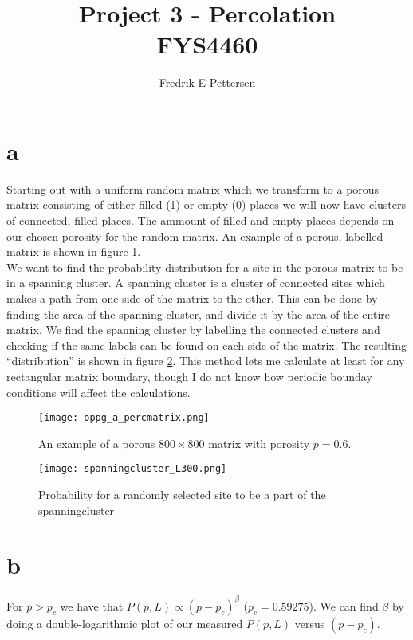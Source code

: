 \documentclass[a4paper,english, 10pt, twoside]{article}
\title{Project 3 - Percolation \\ FYS4460}
\author{Fredrik E Pettersen}
\begin{document}
 
 \maketitle
 \section*{a}
 Starting out with a uniform random matrix which we transform to a porous matrix consisting of
 either filled (1) or empty (0) places we will now have clusters of connected, filled places. 
 The ammount of filled and empty places depends on our chosen porosity for the random matrix. 
 An example of a porous, labelled matrix is shown in figure \ref{perc_matrix_example}.\\
We want to find the probability distribution for a site in the porous matrix to be in a spanning cluster. A 
spanning cluster is a cluster of connected sites which makes a path from one side of the matrix
to the other. This can be done by finding the area of the spanning cluster, and divide it by
the area of the entire matrix. We find the spanning cluster by labelling the connected clusters 
and checking if the same labels can be found on each side of the matrix. The resulting ``distribution'' 
is shown in figure \ref{P(p,L)}.
This method lets me calculate at least for any rectangular matrix boundary, though I do not know how periodic
bounday conditions will affect the calculations.

\begin{figure}[H]
\centering
\texttt{[image: oppg\_a\_percmatrix.png]}
\caption{An example of a porous $800\times800$ matrix with porosity $p = 0.6$.}
\label{perc_matrix_example}
\end{figure}

\begin{figure}[H]
\centering
 \texttt{[image: spanningcluster\_L300.png]}
 \caption{Probability for a randomly selected site to be a part of the spanningcluster}
 \label{P(p,L)}
\end{figure}

\section*{b}
For $p>p_c$ we have that $P(p,L) \propto (p-p_c)^\beta$ ($p_c = 0.59275$). We can find $\beta$ by doing 
a double-logarithmic plot of our measured $P(p,L)$ versus $(p-p_c)$.
\end{document}
